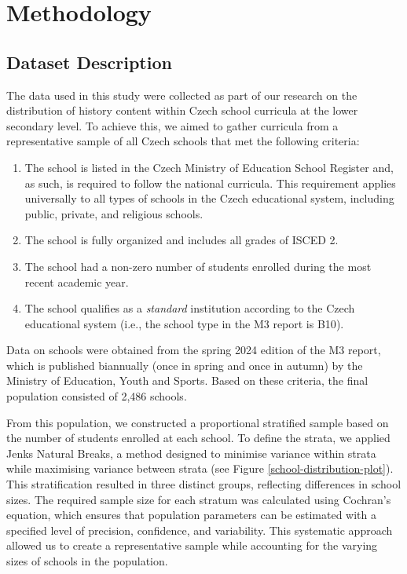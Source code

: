\documentclass[]{interact}
\theoremstyle{plain}%
\theoremstyle{definition}
\theoremstyle{remark}
\begin{document}





\section{Methodology}

\subsection{Dataset Description}

The data used in this study were collected as part of our research on the distribution of history content within Czech school curricula at the lower secondary level. To achieve this, we aimed to gather curricula from a representative sample of all Czech schools that met the following criteria:

\begin{enumerate}
    \item The school is listed in the Czech Ministry of Education School Register and, as such, is required to follow the national curricula. This requirement applies universally to all types of schools in the Czech educational system, including public, private, and religious schools.
    \item The school is fully organized and includes all grades of ISCED 2.
    \item The school had a non-zero number of students enrolled during the most recent academic year.
    \item The school qualifies as a \textit{standard} institution according to the Czech educational system (i.e., the school type in the M3 report is \textsc{B10}).
\end{enumerate}


Data on schools were obtained from the spring 2024 edition of the M3 report, which is published biannually (once in spring and once in autumn) by the Ministry of Education, Youth and Sports. Based on these criteria, the final population consisted of 2,486 schools.

From this population, we constructed a proportional stratified sample based on the number of students enrolled at each school. To define the strata, we applied Jenks Natural Breaks, a method designed to minimise variance within strata while maximising variance between strata (see Figure \ref{school-distribution-plot}). This stratification resulted in three distinct groups, reflecting differences in school sizes. The required sample size for each stratum was calculated using Cochran’s equation, which ensures that population parameters can be estimated with a specified level of precision, confidence, and variability. This systematic approach allowed us to create a representative sample while accounting for the varying sizes of schools in the population.
\end{document}
